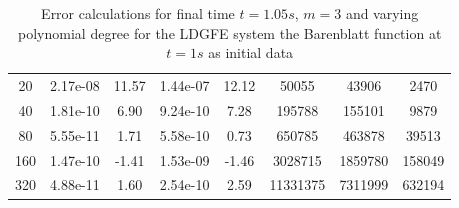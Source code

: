\documentclass[a4paper,12pt]{paper}
\begin{document}
\begin{table}[h]
\begin{minipage}[t]{0.75\linewidth}
{\begin{tabular}{cccccccc}
				20 & 2.17e-08 & 11.57 & 1.44e-07 & 12.12 & 50055 & 43906 & 2470\\
				40 & 1.81e-10 & 6.90 & 9.24e-10 & 7.28 & 195788 & 155101 & 9879\\
				80 & 5.55e-11 & 1.71 & 5.58e-10 & 0.73 & 650785 & 463878 & 39513\\
				160 & 1.47e-10 & -1.41 & 1.53e-09 & -1.46 & 3028715 & 1859780 & 158049\\
				320 & 4.88e-11 & 1.60 & 2.54e-10 & 2.59 & 11331375 & 7311999 & 632194\\
				\hline
		\end{tabular}}
		\caption*{$l=5,~m=3$}
		\label{table:BBM3P5}
	\end{minipage}
	\caption{Error calculations for final time $t=1.05s$, $m=3$ and varying polynomial degree for the LDGFE system the Barenblatt function at $t=1s$ as initial data}
	\label{tabl:APError M=3}
\end{table}
\end{document}
